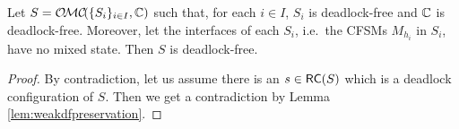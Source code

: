 \begin{corollary}%
\label{prop:weakdfPreservation}
Let $S = \MC(\Set{S_i}_{i\in I}, \cs)$ such that, for each $i\in I$, $S_i$  is deadlock-free and $\mathbb{C}$ is deadlock-free.
Moreover, let the interfaces of each $S_i$,
i.e.\ the CFSMs $M_{h_i}$ in $S_i$, have no mixed state.
Then $S$ is deadlock-free.
\end{corollary}
\begin{proof}
By contradiction, let us assume there is an $s\in \mathsf{RC}(S)$ which is a deadlock configuration of $S$. Then we get a contradiction by Lemma \ref{lem:weakdfpreservation}.
\end{proof}











